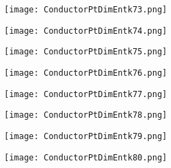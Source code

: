 \documentclass[pdf]{beamer}
\begin{document}
\begin{frame}
\begin{figure}[!h]
\centering
\texttt{[image: ConductorPtDimEntk73.png]}
\end{figure}
\end{frame}

\begin{frame}
\begin{figure}[!h]
\centering
\texttt{[image: ConductorPtDimEntk74.png]}
\end{figure}
\end{frame}

\begin{frame}
\begin{figure}[!h]
\centering
\texttt{[image: ConductorPtDimEntk75.png]}
\end{figure}
\end{frame}

\begin{frame}
\begin{figure}[!h]
\centering
\texttt{[image: ConductorPtDimEntk76.png]}
\end{figure}
\end{frame}

\begin{frame}
\begin{figure}[!h]
\centering
\texttt{[image: ConductorPtDimEntk77.png]}
\end{figure}
\end{frame}

\begin{frame}
\begin{figure}[!h]
\centering
\texttt{[image: ConductorPtDimEntk78.png]}
\end{figure}
\end{frame}

\begin{frame}
\begin{figure}[!h]
\centering
\texttt{[image: ConductorPtDimEntk79.png]}
\end{figure}
\end{frame}

\begin{frame}
\begin{figure}[!h]
\centering
\texttt{[image: ConductorPtDimEntk80.png]}
\end{figure}
\end{frame}
\end{document}
